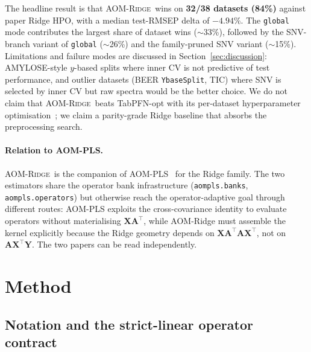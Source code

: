 \documentclass[11pt,a4paper]{article}
\newcommand{\Xmat}{\mathbf{X}}
\newcommand{\Ymat}{\mathbf{Y}}
\newcommand{\Amat}{\mathbf{A}}
\newcommand{\AOMR}{\textsc{AOM-Ridge}\xspace}
\begin{document}
The headline result is that \AOMR\ wins on \textbf{32/38 datasets
(84\%)} against paper Ridge HPO, with a median test-RMSEP delta of
\textbf{$-4.94\%$}. The \texttt{global} mode contributes the largest
share of dataset wins ($\sim$33\%), followed by the SNV-branch variant
of \texttt{global} ($\sim$26\%) and the family-pruned SNV variant
($\sim$15\%). Limitations and failure modes are discussed in
Section~\ref{sec:discussion}: AMYLOSE-style $y$-based splits where
inner CV is not predictive of test performance, and outlier datasets
(BEER \texttt{YbaseSplit}, TIC) where SNV is selected by inner CV but
raw spectra would be the better choice. We do not claim that
\AOMR\ beats TabPFN-opt with its per-dataset hyperparameter
optimisation~\citep{hollmann2025tabpfn}; we claim a parity-grade
Ridge baseline that absorbs the preprocessing search.

\paragraph{Relation to AOM-PLS.}
\AOMR\ is the companion of AOM-PLS~\citep{beurier2026aompls} for the
Ridge family. The two estimators share the operator bank
infrastructure (\texttt{aompls.banks}, \texttt{aompls.operators}) but
otherwise reach the operator-adaptive goal through different routes:
AOM-PLS exploits the cross-covariance identity to evaluate operators
without materialising $\Xmat\Amat^\top$, while AOM-Ridge must assemble
the kernel explicitly because the Ridge geometry depends on
$\Xmat\Amat^\top\Amat\Xmat^\top$, not on $\Amat\Xmat^\top\Ymat$. The
two papers can be read independently.

\section{Method}\label{sec:method}

\subsection{Notation and the strict-linear operator contract}\label{sec:method-notation}
\end{document}
